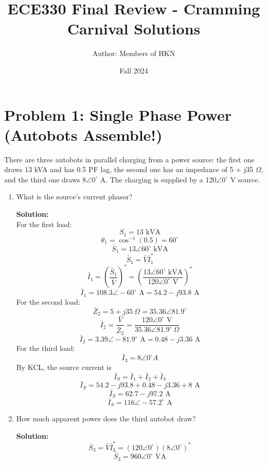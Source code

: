 \documentclass{article}
\title{ECE330 Final Review - Cramming Carnival Solutions}
\author{Author: Members of HKN}
\date{Fall 2024}
\begin{document}
\maketitle


\noindent
\section*{Problem 1: Single Phase Power (Autobots Assemble!)} %
There are three autobots in parallel charging from a power source: the first one draws 13 kVA and has 0.5 PF lag, the second one has an impedance of 5 + j35 $\Omega$, and the third one draws 8$\angle 0^{\circ}$ A. The charging is supplied by a 120$\angle 0^{\circ}$ V source.
\begin{enumerate}[label=(\alph*)]
    \item {What is the source's current phasor?}

\textbf{Solution:} \\
For the first load:
$$S_1 = 13\text{ kVA}$$
$$\theta_1 = \cos^{-1}(0.5) = 60^{\circ}$$
$$\bar{S}_1 = 13\angle 60^{\circ} \text{ kVA} $$
$$\bar{S}_1 = \bar{V}\bar{I}_1^{\ast}$$
$$\bar{I}_1 = \left(\frac{\bar{S}_1}{\bar{V}}\right)^{\ast} = \left(\frac{13 \angle 60^{\circ} \text{ kVA}}{120 \angle 0^{\circ} \text{ V}}\right)^{\ast}$$
$$\bar{I}_1 = 108.3 \angle -60^{\circ} \text{ A} = 54.2 - j93.8 \text{ A}$$
For the second load:
$$\bar{Z}_2 = 5 + j35\ \Omega = 35.36 \angle 81.9^{\circ}$$
$$\bar{I}_2 = \frac{\bar{V}}{\bar{Z}_2} = \frac{120\angle 0^{\circ}\text{ V}}{35.36\angle 81.9^{\circ} \ \Omega}$$
$$\bar{I}_2 = 3.39 \angle -81.9^{\circ} \text{ A} = 0.48 - j3.36 \text{ A}$$
For the third load:
$$\bar{I}_3 = 8\angle 0^{\circ} A$$
By KCL, the source current is
$$\bar{I}_S = \bar{I}_1 + \bar{I}_2 + \bar{I}_3$$
$$\bar{I}_S = 54.2 - j93.8 + 0.48 - j3.36 + 8 \text{ A}$$
$$\bar{I}_S = 62.7 - j97.2 \text{ A}$$
$$\boxed{\bar{I}_S = 116 \angle -57.2^{\circ} \text{ A}}$$

    \item {How much apparent power does the third autobot draw?}
    
\textbf{Solution:} \\
$$\bar{S}_3 = \bar{V}\bar{I}_3^{\ast} = (120\angle 0^{\circ})(8\angle 0^{\circ})^{\ast}$$
$$\boxed{\bar{S}_3 = 960\angle 0^{\circ} \text{ VA}}$$
\end{enumerate}

\newpage %
\noindent
\end{document}
